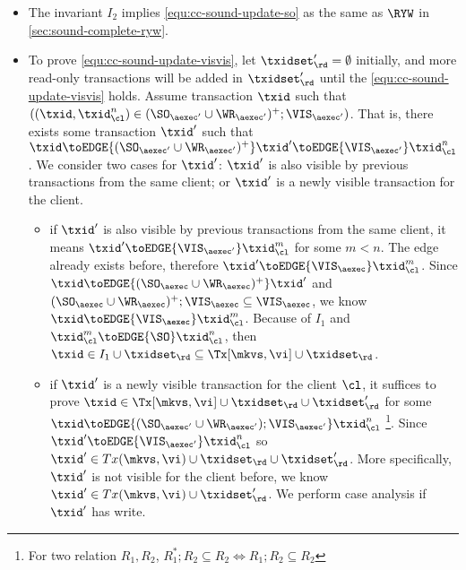 \begin{itemize}
\item The invariant \( I_2 \) implies \cref{equ:cc-sound-update-so} as the same as \( \RYW \) in \cref{sec:sound-complete-ryw}.
\item To prove \cref{equ:cc-sound-update-visvis}, let \( \txidset'_\rd = \emptyset \) initially,
and more read-only transactions will be added in \( \txidset'_\rd \) until the \cref{equ:cc-sound-update-visvis} holds.
Assume transaction \( \txid \) such that \( ((\txid, \txid_\cl^n) \in ( \SO_{\aexec'} \cup \WR_{\aexec'} )^{+} ; \VIS_{\aexec'}) \).
That is, there exists some transaction \( \txid' \) such that
\( \txid \toEDGE{( \SO_{\aexec'} \cup \WR_{\aexec'} )^+}  \txid' \toEDGE{\VIS_{\aexec'}} \txid_\cl^n\).
We consider two cases for \( \txid' \): \( \txid' \) is also visible by previous transactions from the same client; 
or \( \txid' \) is a newly visible transaction for the client.
\begin{itemize}
    \item if \( \txid' \) is also visible by previous transactions from the same client, it means \( \txid' \toEDGE{\VIS_{\aexec'}} \txid_\cl^m \) for some \( m < n \).
    The edge already exists before, therefore \( \txid' \toEDGE{\VIS_\aexec} \txid_\cl^m \).
    Since \( \txid \toEDGE{( \SO_{\aexec} \cup \WR_{\aexec} )^{+}} \txid' \) and \( ( \SO_{\aexec} \cup \WR_{\aexec} )^{+} ; \VIS_{\aexec} \subseteq \VIS_{\aexec} \),
    we know \( \txid \toEDGE{ \VIS_{\aexec} }  \txid_\cl^m  \).
    Because of \( I_1 \) and \( \txid_\cl^m \toEDGE{\SO} \txid_\cl^n \), then \( \txid \in I_1 \cup \txidset_\rd \subseteq \Tx[\mkvs, \vi] \cup \txidset_\rd \).
    
    \item if \( \txid' \) is a newly visible transaction for the client \( \cl \),
    it suffices to prove \(\txid \in \Tx[\mkvs, \vi] \cup \txidset_\rd \cup \txidset'_\rd \) 
    for some \( \txid \toEDGE{ ( \SO_{\aexec'} \cup \WR_{\aexec'} ) ; \VIS_{\aexec'} } \txid_\cl^n  \)%
    \footnote{For two relation \( R_1, R_2\), \( R_1^* ; R_2 \subseteq R_2 \iff R_1 ; R_2 \subseteq R_2 \) }.
    Since \( \txid' \toEDGE{\VIS_{\aexec'}} \txid_\cl^n \) so \( \txid' \in Tx(\mkvs, \vi) \cup \txidset_\rd \cup \txidset'_\rd\).
    More specifically, \( \txid' \) is not visible for the client before, we know \( \txid' \in Tx(\mkvs, \vi) \cup \txidset'_\rd\).
    We perform case analysis if \( \txid' \) has write.
    \begin{itemize}


\end{itemize}
\end{itemize}
\end{itemize}
